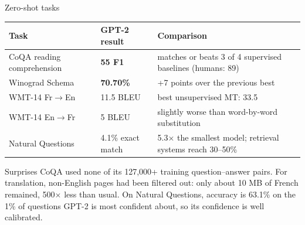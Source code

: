 \documentclass[aspectratio=169,11pt]{beamer}
\begin{document}
\begin{frame}{Zero-shot tasks}
  \centering
  \footnotesize
  \begin{tabular}{@{}lll@{}}
    \toprule
    Task & GPT-2 result & Comparison\\
    \midrule
    CoQA reading comprehension & \textbf{55 F1} & matches or beats 3 of 4 supervised baselines (humans: 89)\\
    Winograd Schema & \textbf{70.70\%} & +7 points over the previous best\\
    WMT-14 Fr$\to$En & 11.5 BLEU & best unsupervised MT: 33.5\\
    WMT-14 En$\to$Fr & 5 BLEU & slightly worse than word-by-word substitution\\
    Natural Questions & 4.1\% exact match & 5.3$\times$ the smallest model; retrieval systems reach 30--50\%\\
    \bottomrule
  \end{tabular}
  \vspace{2mm}

  \raggedright
  \begin{exampleblock}{Surprises}
    \small
    CoQA used none of its 127,000+ training question--answer pairs. For translation, non-English pages had been filtered out: only about 10 MB of French remained, 500$\times$ less than usual. On Natural Questions, accuracy is 63.1\% on the 1\% of questions GPT-2 is most confident about, so its confidence is well calibrated.
  \end{exampleblock}
\end{frame}
\end{document}
